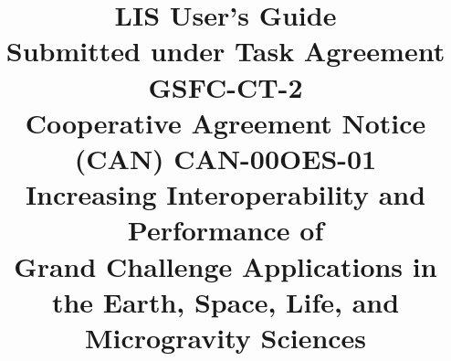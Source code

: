 \title{{\bf LIS User's Guide} \\
\nextpar
\normalsize Submitted under Task Agreement GSFC-CT-2 \\
\nextpar
\normalsize Cooperative Agreement Notice (CAN) CAN-00OES-01 \\
\nextpar
\normalsize Increasing Interoperability and Performance of \\
Grand Challenge Applications in the Earth, 
Space, Life, and Microgravity Sciences \\
}
